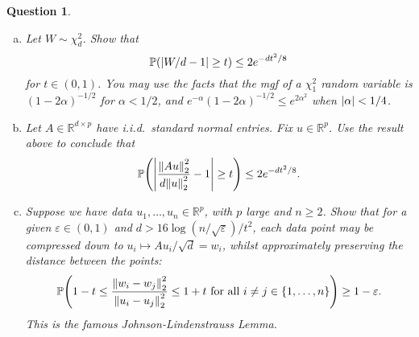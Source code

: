 \documentclass{article}
\theoremstyle{plain}
\newtheorem{question}{Question}
\theoremstyle{remark}
\renewcommand{\epsilon}{\varepsilon}
\newcommand{\Bb}{\mathbb}
\newcommand{\PP}{\Bb P}
\newcommand{\RR}{\Bb R}
\newcommand\eps\epsilon
\begin{document}
\begin{question}
	\begin{enumerate}[(a)]
		\item Let $W \sim \chi_d^2$. Show that
		\[
		\PP(\abs{W/d - 1} \geq t) \leq 2e^{-dt^2/8}
		\]
		for $t \in (0, 1)$. You may use the facts that the mgf of a $\chi_1^2$ random variable is $(1 - 2\alpha)^{-1/2}$ for $\alpha < 1/2$, and $e^{-\alpha} (1 - 2\alpha)^{-1/2} \leq e^{2\alpha^2}$ when $\abs{\alpha} < 1/4$. 
		
		\item Let $A \in \RR^{d\times p}$ have i.i.d.\ standard normal entries. Fix $u \in \RR^p$. Use the result above to conclude that
		\[
		\PP\qty(\abs{\frac{\norm{Au}_2^2}{d \norm{u}_2^2} - 1} \geq t) \leq 2e^{-dt^2/8}. 
		\]
		
		\item Suppose we have data $u_1, \dotsc, u_n \in \RR^p$, with $p$ large and $n \geq 2$. Show that for a given $\eps \in (0, 1)$ and $d > 16\log(n/\sqrt\eps)/t^2$, each data point may be compressed down to $u_i \mapsto Au_i/\sqrt d = w_i$, whilst approximately preserving the distance between the points:
		\[
		\PP\qty(1 - t \leq \frac{\norm{w_i - w_j}_2^2}{\norm{u_i - u_j}_2^2} \leq 1 + t \text{ for all } i \neq j \in \qty{1, \dotsc, n}) \geq 1 - \eps. 
		\]
		This is the famous Johnson-Lindenstrauss Lemma. 
	\end{enumerate}
\end{question}
\end{document}
